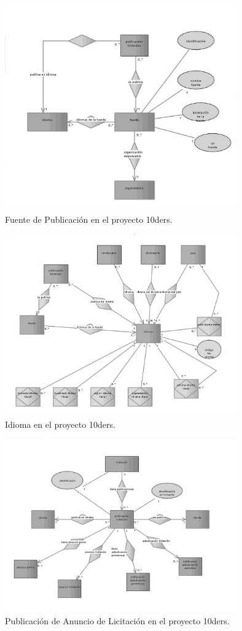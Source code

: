 \begin{figure}[!htb]
\centering
	\includegraphics[width=10cm]{images/phd/eproc/10ders-8}
\caption{Fuente de Publicación en el proyecto 10ders.}
\label{fig:10ders-8}
\end{figure}

\begin{figure}[!htb]
\centering
	\includegraphics[width=10cm]{images/phd/eproc/10ders-9}
\caption{Idioma en el proyecto 10ders.}
\label{fig:10ders-9}
\end{figure}



\begin{figure}[!htb]
\centering
	\includegraphics[width=10cm]{images/phd/eproc/10ders-1}
\caption{Publicación de Anuncio de Licitación en el proyecto 10ders.}
\label{fig:10ders-1}
\end{figure}


